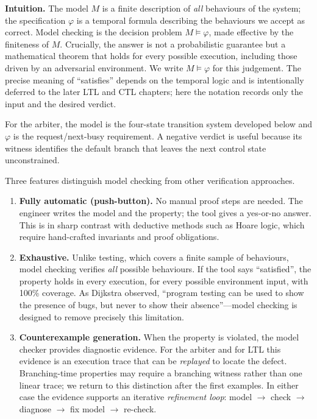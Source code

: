 \medskip\noindent
\textbf{Intuition.}  The model $M$ is a finite description of \emph{all}
behaviours of the system; the specification $\varphi$ is a temporal
formula describing the behaviours we accept as correct.  Model checking
is the decision problem $M \models \varphi$, made effective by the
finiteness of $M$.  Crucially, the answer is not a probabilistic
guarantee but a mathematical theorem that holds for every possible
execution, including those driven by an adversarial environment.  We write
$M \models \varphi$ for this judgement.  The precise meaning of
``satisfies'' depends on the temporal logic and is intentionally deferred to
the later LTL and CTL chapters; here the notation records only the input and
the desired verdict.

For the arbiter, the model is the four-state transition system developed
below and $\varphi$ is the request/next-busy requirement.  A negative verdict
is useful because its witness identifies the default branch that leaves the
next control state unconstrained.

Three features distinguish model checking from other verification approaches.

\begin{enumerate}
  \item \textbf{Fully automatic (push-button).}  No manual proof steps are
        needed.  The engineer writes the model and the property; the tool
        gives a yes-or-no answer.  This is in sharp contrast with deductive
        methods such as Hoare logic, which require hand-crafted invariants and
        proof obligations.
  \item \textbf{Exhaustive.}  Unlike testing, which covers a finite sample of
        behaviours, model checking verifies \emph{all} possible behaviours.
        If the tool says ``satisfied'', the property holds in every execution,
        for every possible environment input, with 100\% coverage.  As
        Dijkstra observed, ``program testing can be used to show the presence
        of bugs, but never to show their absence''---model checking is
        designed to remove precisely this limitation.
  \item \textbf{Counterexample generation.}  When the property is violated,
        the model checker provides diagnostic evidence.  For the arbiter and
        for LTL this evidence is an execution trace that can be \emph{replayed}
        to locate the defect.  Branching-time properties may require a
        branching witness rather than one linear trace; we return to this
        distinction after the first examples.  In either case the evidence
        supports an iterative \emph{refinement loop}: model $\to$ check
        $\to$ diagnose $\to$ fix model $\to$ re-check.
\end{enumerate}

